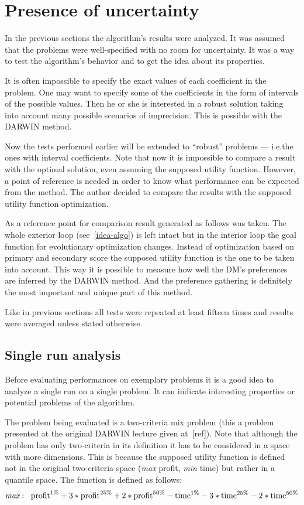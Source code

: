 \section{Presence of uncertainty}
In the previous sections the algorithm's results were analyzed. It was assumed
that the problems were well-specified with no room for uncertainty. It was a
way to test the algorithm's behavior and to get the idea about its properties.

It is often impossible to specify the exact values of each coefficient in the
problem. One may want to specify some of the coefficients in the form of
intervals of the possible values. Then he or she is interested in a robust
solution taking into account many possible scenarios of imprecision. This is
possible with the DARWIN method.

Now the tests performed earlier will be extended to ``robust'' problems ---
i.e.the ones with interval coefficients. Note that now it is impossible to
compare a result with the optimal solution, even assuming the supposed utility
function. However, a point of reference is needed in order to know what
performance can be expected from the method. The author decided to compare the
results with the supposed utility function optimization.

As a reference point for comparison result generated as follows was taken. The
whole exterior loop (see~\ref{idea-algo}) is left intact but in the interior loop the
goal function for evolutionary optimization changes. Instead of optimization
based on primary and secondary score the supposed utility function is the one
to be taken into account. This way it is possible to measure how well the DM's
preferences are inferred by the DARWIN method. And the preference gathering is
definitely the most important and unique part of this method.

Like in previous sections all tests were repeated at least fifteen times and
results were averaged unless stated otherwise.

\subsection{Single run analysis}
Before evaluating performances on exemplary problems it is a good idea to
analyze a single run on a single problem. It can indicate interesting
properties or potential problems of the algorithm.

The problem being evaluated is a two-criteria mix problem (this a problem
presented at the original DARWIN lecture given at~[ref]). Note that although
the problem has only two-criteria in its definition it has to be considered in
a space with more dimensions. This is because the supposed utility function is
defined not in the original two-criteria space (\textit{max} profit,
\textit{min} time) but rather in a quantile space. The function is defined as
follows:
\begin{equation*}
\textit{max}: \hspace{0.2cm} \text{profit}^{1\%} + 3 * \text{profit}^{25\%} +
2 * \text{profit}^{50\%} - \text{time}^{1\%} - 3 * \text{time}^{25\%} - 2 *
\text{time}^{50\%}
\end{equation*}

